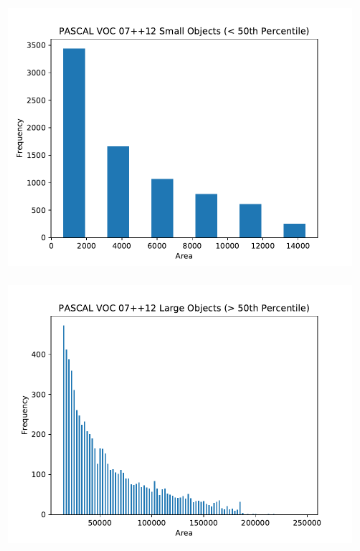 \begin{figure}[H]
    \centering
    \begin{subfigure}[b]{0.45\textwidth}
        \center
        \includegraphics[width=\textwidth]{Figs/Implementation/testsmallhist.pdf}
        \caption{}\label{fig:smalltesthist}
    \end{subfigure}
    \begin{subfigure}[b]{0.45\textwidth}
        \center
        \includegraphics[width=\textwidth]{Figs/Implementation/testlargehist.pdf}
        \caption{}\label{fig:largetesthist}
    \end{subfigure}
    \caption{}
    \label{}
\end{figure} 

